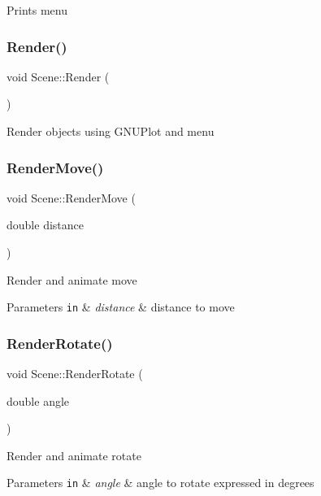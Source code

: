 Prints menu \mbox{\label{classScene_a91913b921d41d374e00eac347358dc14}} 
\subsubsection{\texorpdfstring{Render()}{Render()}}
{\footnotesize\ttfamily void Scene\+::\+Render (\begin{DoxyParamCaption}{ }\end{DoxyParamCaption})}

Render objects using G\+N\+U\+Plot and menu \mbox{\label{classScene_a4c4182f461b3874840a721b3e9828eae}} 
\subsubsection{\texorpdfstring{Render\+Move()}{RenderMove()}}
{\footnotesize\ttfamily void Scene\+::\+Render\+Move (\begin{DoxyParamCaption}\item[{double}]{distance }\end{DoxyParamCaption})}

Render and animate move 
\begin{DoxyParams}[1]{Parameters}
\mbox{\tt in}  & {\em distance} & distance to move \\
\hline
\end{DoxyParams}
\mbox{\label{classScene_a849cf1c78718f18d5ae36c7ca7a38562}} 
\subsubsection{\texorpdfstring{Render\+Rotate()}{RenderRotate()}}
{\footnotesize\ttfamily void Scene\+::\+Render\+Rotate (\begin{DoxyParamCaption}\item[{double}]{angle }\end{DoxyParamCaption})}

Render and animate rotate 
\begin{DoxyParams}[1]{Parameters}
\mbox{\tt in}  & {\em angle} & angle to rotate expressed in degrees \\
\hline
\end{DoxyParams}


